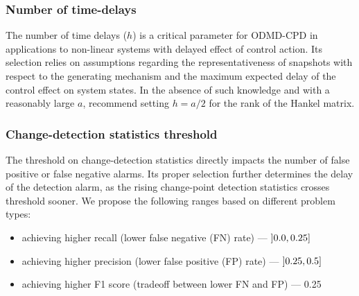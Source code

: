 \subsubsection{Number of time-delays}
The number of time delays (\(h\)) is a critical parameter for ODMD-CPD in applications to non-linear systems with delayed effect of control action. Its selection relies on assumptions regarding the representativeness of snapshots with respect to the generating mechanism and the maximum expected delay of the control effect on system states. In the absence of such knowledge and with a reasonably large \(a\), \citet{Moskvina2003} recommend setting \(h = a / 2\) for the rank of the Hankel matrix.

\subsubsection{Change-detection statistics threshold}
The threshold on change-detection statistics directly impacts the number of false positive or false negative alarms. Its proper selection further determines the delay of the detection alarm, as the rising change-point detection statistics crosses threshold sooner. We propose the following ranges based on different problem types:
\begin{itemize}
    \item achieving higher recall (lower false negative (FN) rate) --- \( \interval[open left]{0.0}{0.25} \)
    \item achieving higher precision (lower false positive (FP) rate) --- \( \interval[open left]{0.25}{0.5} \)
    \item achieving higher F1 score (tradeoff between lower FN and FP) --- 0.25
\end{itemize}
